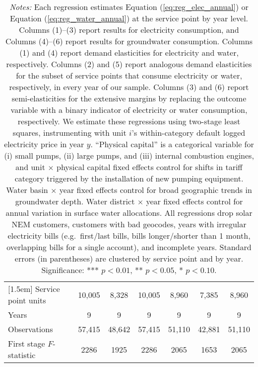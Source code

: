 \begin{table}[t!]
\begin{adjustbox}{center}
\begin{tabular}{lcccccc}
[1.5em] 
Service point units & 10,005 & 8,328 & 10,005 & 8,960 & 7,385 & 8,960  \\ 
[0.1em] 
Years  & 9 & 9 & 9 & 9 & 9 & 9 \\ 
[0.1em] 
Observations & 57,415 & 48,642 & 57,415 & 51,110 & 42,881 & 51,110 \\ 
[0.1em] 
First stage $F$-statistic & 2286 & 1925 & 2286 & 2065 & 1653 & 2065 \\ 
[0.15em]
\hline
\end{tabular}
\end{adjustbox}
\captionsetup{width=\textwidth}
\caption*{\scriptsize \emph{Notes:} Each regression estimates Equation (\ref{eq:reg_elec_annual}) or Equation (\ref{eq:reg_water_annual}) at the service point by year level.
Columns (1)--(3) report results for electricity consumption, and Columns (4)--(6) report results for groundwater consumption.
Columns (1) and (4) report demand elasticities for electricity and water, respectively.
Columns (2) and (5) report analogous demand elasticities for the subset of service points that consume electricity or water, respectively, in every year of our sample.
Columns (3) and (6) report semi-elasticities for the extensive margins by replacing the outcome variable with a binary indicator of electricity or water consumption, respectively.
We estimate these regressions using two-stage least squares, instrumenting with unit $i$'s within-category default logged electricity price in year $y$.
``Physical capital'' is a categorical variable for (i) small pumps, (ii) large pumps, and (iii) internal combustion engines, and unit $\times$
physical capital fixed effects control for shifts in tariff category triggered by the installation of new pumping equipment.
Water basin $\times$ year fixed effects control for broad geographic trends in groundwater depth.
Water district $\times$ year fixed effects control for annual variation in surface water allocations.
All regressions drop solar NEM customers, customers with bad geocodes, years with irregular electricity bills
(e.g.\ first/last bills, bills longer/shorter than 1 month, overlapping bills for a single account), and incomplete years.
Standard errors (in parentheses) are clustered by service point and by year.
Significance: *** $p < 0.01$, ** $p < 0.05$, * $p < 0.10$.
}
\end{table}
